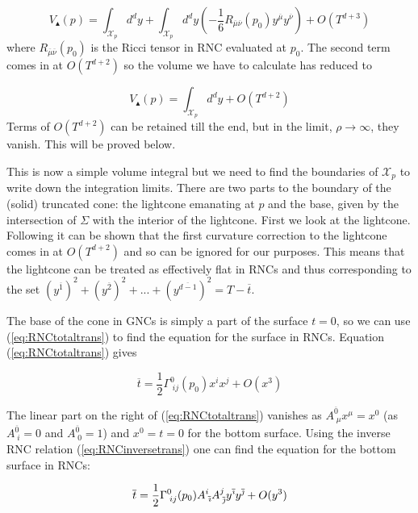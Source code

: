 \documentclass[12pt]{article}
\newcommand{\be}{\begin{equation}}
\newcommand{\ee}{\end{equation}}
\newcommand{\mb}[1]{\marginnote{\color{red}{\small MB:\,#1}}}
\newcommand{\ibar}{{\overline{\emph\i}}}
\newcommand{\jbar}{{\overline{\emph\j}}}
\begin{document}
\be\label{eq:VolumeWithRNC}
V_\blacktriangle(p) =\int_{\mathcal{X}_p}d^dy+\int_{\mathcal{X}_p}d^dy\left(-\frac{1}{6}R_{\overline{\mu}\overline{\nu}}(p_0)y^{\overline{\mu}}y^{\overline{\nu}} \right)+O(T^{d+3})
\ee
where $R_{\overline{\mu}\overline{\nu}}(p_0)$ is the Ricci tensor in RNC evaluated at $p_0$.\mb{justify beforehand which orders to keep?}
The second term comes in at $O(T^{d+2})$ so the volume we have to calculate has reduced to

\be\label{eq:VolumeToLowestOrder}
V_\blacktriangle(p) =\int_{\mathcal{X}_p}d^dy+O(T^{d+2})
\ee
Terms of $O(T^{d+2})$ can be retained till the end, but in the limit, $\rho\rightarrow\infty$, they vanish. This will be proved below.

This is now a simple volume integral but we need to find the boundaries of $\mathcal{X}_p$ to write down the integration limits. There are two parts to the boundary of the (solid) truncated cone: the lightcone emanating at $p$ and the base, given by the intersection of $\Sigma$ with the interior of the lightcone. First we look at the lightcone. Following \cite{Khetrapal_Sumati:Causal_Diamond_Volume} it can be shown that the first curvature correction to the lightcone comes in at $O(T^{d+2})$ and so can be ignored for our purposes. This means that the lightcone can be treated as effectively flat in RNCs and thus corresponding to the set $(y^{\overline{1}})^2+(y^{\overline{2}})^2+...+(y^{\overline{d-1}})^2= T-\overline{t}$.\mb{what limit on $\bar t$?}

The base of the cone in GNCs is simply a part of the surface $t=0$, so we can use (\ref{eq:RNCtotaltrans}) to find the equation for the surface in RNCs. Equation (\ref{eq:RNCtotaltrans}) gives

\be\label{eq:BottomSurfaceWithGNC}
\overline{t}=\frac{1}{2}\Gamma^{0}_{\;ij}(p_0)x^i x^j+O( x^3)\ee

The linear part on the right of (\ref{eq:RNCtotaltrans}) vanishes as $A^{\overline{0}}_{\;\mu}x^{\mu}=x^0$ (as $A^{\overline{0}}_{\;i}=0$ and $A^{\overline{0}}_{\;0}=1$) and $x^0=t=0$ for the bottom surface. Using the inverse RNC relation (\ref{eq:RNCinversetrans}) one can find the equation for the bottom surface in RNCs:

\be\label{eq:BottomSurface}
\overline{t}=\frac{1}{2}\Gamma^{0}_{\;ij}(p_0)A^{i}_{\;\ibar}A^{j}_{\;\jbar}y^{\ibar} y^{\jbar}+O(y^3)
\ee
\end{document}
